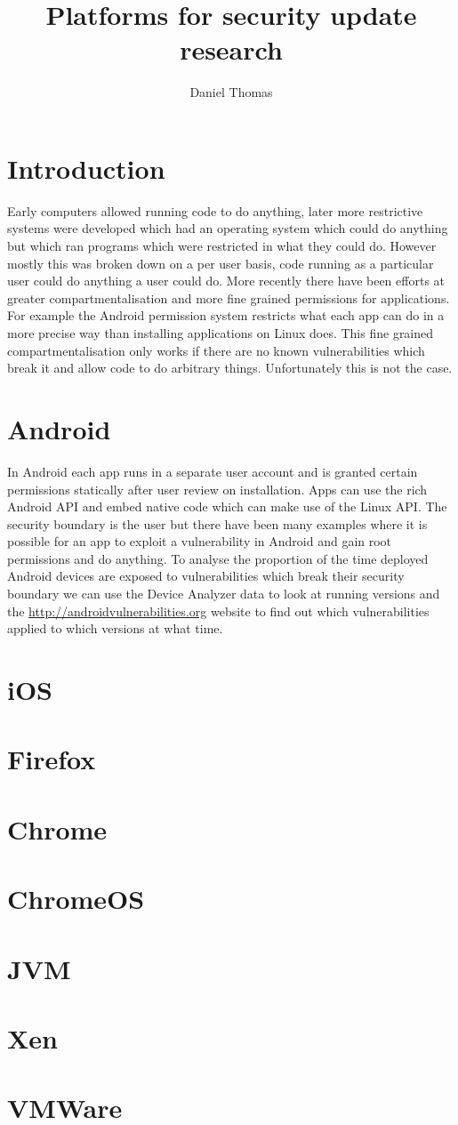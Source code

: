 \documentclass[12pt,a4paper]{article}
\author{Daniel Thomas}
\title{Platforms for security update research}
\begin{document}
\maketitle

\section{Introduction}
Early computers allowed running code to do anything, later more restrictive systems were developed which had an operating system which could do anything but which ran programs which were restricted in what they could do.
However mostly this was broken down on a per user basis, code running as a particular user could do anything a user could do.
More recently there have been efforts at greater compartmentalisation and more fine grained permissions for applications.
For example the Android permission system restricts what each app can do in a more precise way than installing applications on Linux does.
This fine grained compartmentalisation only works if there are no known vulnerabilities which break it and allow code to do arbitrary things.
Unfortunately this is not the case.

\section{Android}
In Android each app runs in a separate user account and is granted certain permissions statically after user review on installation.
Apps can use the rich Android API and embed native code which can make use of the Linux API.
The security boundary is the user but there have been many examples where it is possible for an app to exploit a vulnerability in Android and gain root permissions and do anything.
To analyse the proportion of the time deployed Android devices are exposed to vulnerabilities which break their security boundary we can use the Device Analyzer data to look at running versions and the \url{http://androidvulnerabilities.org} website to find out which vulnerabilities applied to which versions at what time.

\section{iOS}
\section{Firefox}
\section{Chrome}
\section{ChromeOS}
\section{JVM}
\section{Xen}
\section{VMWare}

\printbibliography
\end{document}
